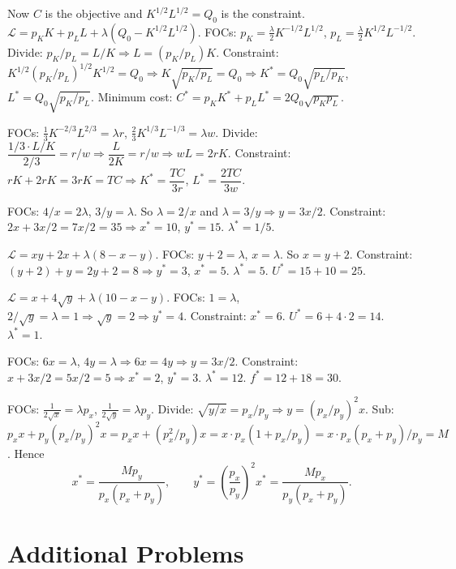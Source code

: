 \begin{solutions}
  \item Now $C$ is the objective and $K^{1/2} L^{1/2} = Q_0$ is the constraint. $\mathcal{L} = p_K K + p_L L + \lambda(Q_0 - K^{1/2} L^{1/2})$. FOCs: $p_K = \tfrac{\lambda}{2} K^{-1/2} L^{1/2}$, $p_L = \tfrac{\lambda}{2} K^{1/2} L^{-1/2}$. Divide: $p_K/p_L = L/K \Rightarrow L = (p_K/p_L) K$. Constraint: $K^{1/2}(p_K/p_L)^{1/2} K^{1/2} = Q_0 \Rightarrow K \sqrt{p_K/p_L} = Q_0 \Rightarrow K^* = Q_0 \sqrt{p_L/p_K}$, $L^* = Q_0 \sqrt{p_K/p_L}$. Minimum cost: $C^* = p_K K^* + p_L L^* = 2 Q_0 \sqrt{p_K p_L}$.
  \item FOCs: $\tfrac{1}{3} K^{-2/3} L^{2/3} = \lambda r$, $\tfrac{2}{3} K^{1/3} L^{-1/3} = \lambda w$. Divide: $\dfrac{1/3 \cdot L/K}{2/3} = r/w \Rightarrow \dfrac{L}{2 K} = r/w \Rightarrow w L = 2 r K$. Constraint: $r K + 2 r K = 3 r K = TC \Rightarrow K^* = \dfrac{TC}{3 r}$, $L^* = \dfrac{2 TC}{3 w}$.
  \item FOCs: $4/x = 2 \lambda$, $3/y = \lambda$. So $\lambda = 2/x$ and $\lambda = 3/y \Rightarrow y = 3 x / 2$. Constraint: $2 x + 3 x/2 = 7 x/2 = 35 \Rightarrow x^* = 10$, $y^* = 15$. $\lambda^* = 1/5$.
  \item $\mathcal{L} = x y + 2 x + \lambda(8 - x - y)$. FOCs: $y + 2 = \lambda$, $x = \lambda$. So $x = y + 2$. Constraint: $(y + 2) + y = 2 y + 2 = 8 \Rightarrow y^* = 3$, $x^* = 5$. $\lambda^* = 5$. $U^* = 15 + 10 = 25$.
  \item $\mathcal{L} = x + 4 \sqrt{y} + \lambda(10 - x - y)$. FOCs: $1 = \lambda$, $2/\sqrt{y} = \lambda = 1 \Rightarrow \sqrt{y} = 2 \Rightarrow y^* = 4$. Constraint: $x^* = 6$. $U^* = 6 + 4 \cdot 2 = 14$. $\lambda^* = 1$.
  \item FOCs: $6 x = \lambda$, $4 y = \lambda \Rightarrow 6 x = 4 y \Rightarrow y = 3 x / 2$. Constraint: $x + 3 x/2 = 5 x/2 = 5 \Rightarrow x^* = 2$, $y^* = 3$. $\lambda^* = 12$. $f^* = 12 + 18 = 30$.
  \item FOCs: $\tfrac{1}{2 \sqrt{x}} = \lambda p_x$, $\tfrac{1}{2 \sqrt{y}} = \lambda p_y$. Divide: $\sqrt{y/x} = p_x/p_y \Rightarrow y = (p_x/p_y)^2 x$. Sub: $p_x x + p_y (p_x/p_y)^2 x = p_x x + (p_x^2/p_y) x = x \cdot p_x(1 + p_x/p_y) = x \cdot p_x (p_x + p_y)/p_y = M$. Hence
  \[ x^* = \frac{M p_y}{p_x(p_x + p_y)}, \qquad y^* = \left(\frac{p_x}{p_y}\right)^2 x^* = \frac{M p_x}{p_y(p_x + p_y)}. \]
\end{solutions}

\section{Additional Problems}

